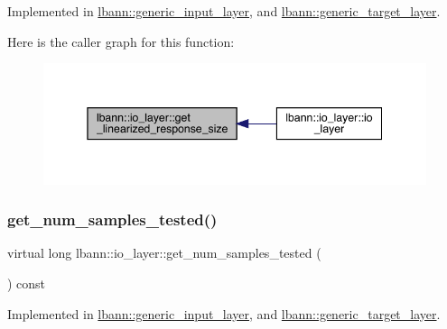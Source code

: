 Implemented in \hyperlink{classlbann_1_1generic__input__layer_a6e5e587aa5b32bdfd2dd579a2746885d}{lbann\+::generic\+\_\+input\+\_\+layer}, and \hyperlink{classlbann_1_1generic__target__layer_a55c3e1bcb3e4611c379b1082183b3e66}{lbann\+::generic\+\_\+target\+\_\+layer}.

Here is the caller graph for this function\+:\nopagebreak
\begin{figure}[H]
\begin{center}
\leavevmode
\includegraphics[width=345pt]{classlbann_1_1io__layer_acbc2723e37e911eef6a38caa02c9e708_icgraph}
\end{center}
\end{figure}
\mbox{\label{classlbann_1_1io__layer_a2b2c9d3c1efce23840ef0c88ec566616}} 
\subsubsection{\texorpdfstring{get\+\_\+num\+\_\+samples\+\_\+tested()}{get\_num\_samples\_tested()}}
{\footnotesize\ttfamily virtual long lbann\+::io\+\_\+layer\+::get\+\_\+num\+\_\+samples\+\_\+tested (\begin{DoxyParamCaption}{ }\end{DoxyParamCaption}) const\hspace{0.3cm}{\ttfamily [pure virtual]}}



Implemented in \hyperlink{classlbann_1_1generic__input__layer_a68b162bcc5fdfe2bb7279eb5d83cf884}{lbann\+::generic\+\_\+input\+\_\+layer}, and \hyperlink{classlbann_1_1generic__target__layer_a0187134110cd8a641e15f86e010b75a7}{lbann\+::generic\+\_\+target\+\_\+layer}.

